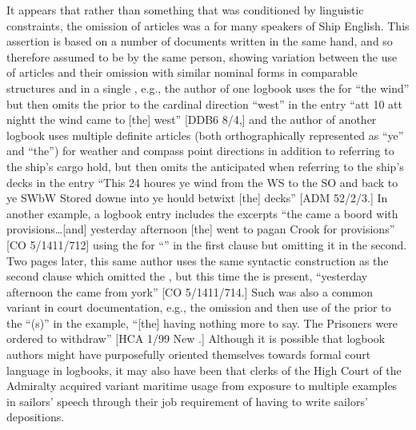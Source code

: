 It appears that rather than something that was conditioned by linguistic constraints, the omission of articles was a  for many speakers of Ship English. This assertion is based on a number of documents written in the same hand, and so therefore assumed to be by the same person, showing variation between the use of articles and their omission with similar nominal forms in comparable structures and in a single , e.g., the author of one logbook uses the  for “the wind” but then omits the  prior to the cardinal direction “west” in the entry “att 10 att nightt the wind came to [the] west” [DDB6 8/4,] and the author of another logbook uses multiple definite articles (both orthographically represented as “ye” and “the”) for weather and compass point directions in addition to referring to the ship’s cargo hold, but then omits the anticipated  when referring to the ship’s decks in the entry “This 24 houres ye wind from the WS to the SO and back to ye SWbW Stored downe into ye hould betwixt [the] decks” [ADM 52/2/3.] In another example, a logbook entry includes the excerpts “the  came a boord with provisions…[and] yesterday afternoon [the]  went to pagan Crook for provisions” [CO 5/1411/712] using the  for “” in the first clause but omitting it in the second. Two pages later, this same author uses the same syntactic construction as the second clause which omitted the , but this time the  is present, “yesterday afternoon the  came from york” [CO 5/1411/714.] Such  was also a common variant in court documentation, e.g., the omission and then use of the  prior to the  “(s)” in the example, “[the]  having nothing more to say. The Prisoners were ordered to withdraw” [HCA 1/99 New \citealt{Providence1722}.] Although it is possible that logbook authors might have purposefully oriented themselves towards formal court language in logbooks, it may also have been that clerks of the High Court of the Admiralty acquired variant maritime usage from exposure to multiple examples in sailors’ speech through their job requirement of having to write sailors’ depositions. 

